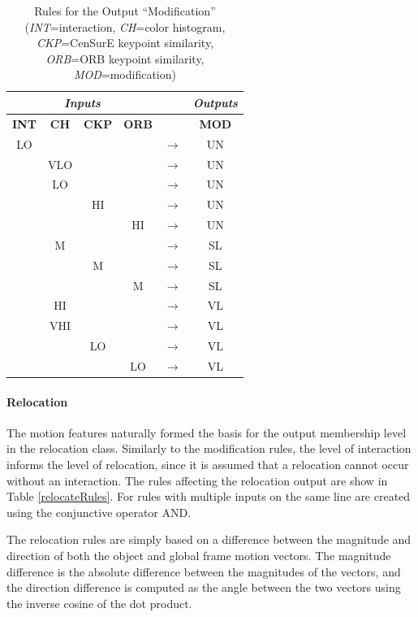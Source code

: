 \documentclass[12pt]{report}
\begin{document}
\begin{table}
\caption{Rules for the Output ``Modification'' (\textit{INT}=interaction, \textit{CH}=color histogram, \textit{CKP}=CenSurE keypoint similarity, \textit{ORB}=ORB keypoint similarity,  \textit{MOD}=modification)}
\begin{center}
\begin{tabular}{cccccc}
\hline
\multicolumn{4}{c}{\textbf{\textit{Inputs}}}& &\textbf{\textit{Outputs}} \\
\hline
\hline
\textbf{INT} & \textbf{CH} & \textbf{CKP} & \textbf{ORB} & & \textbf{MOD}\\
\hline
LO & & & & $\longrightarrow$ & UN \\
 & VLO & &  & $\longrightarrow$ & UN \\
 & LO & & & $\longrightarrow$ & UN \\
 & & HI & & $\longrightarrow$ & UN \\
 & & & HI & $\longrightarrow$ & UN \\
 & M & & & $\longrightarrow$ & SL \\
 & & M & & $\longrightarrow$ & SL \\
 & & & M & $\longrightarrow$ & SL \\
 & HI & & &  $\longrightarrow$ & VL \\
 & VHI & & & $\longrightarrow$ & VL \\
 & & LO & & $\longrightarrow$ & VL \\
 & & & LO & $\longrightarrow$ & VL \\
\hline
\end{tabular}
\label{modifyRules}
\end{center}
\end{table}

\paragraph{Relocation}
The motion features naturally formed the basis for the output membership level in the relocation class. Similarly to the modification rules, the level of interaction informs the level of relocation, since it is assumed that a relocation cannot occur without an interaction. The rules affecting the relocation output are show in Table \ref{relocateRules}. For rules with multiple inputs on the same line are created using the conjunctive operator AND.

The relocation rules are simply based on a difference between the magnitude and direction of both the object and global frame motion vectors. The magnitude difference is the absolute difference between the magnitudes of the vectors, and the direction difference is computed as the angle between the two vectors using the inverse cosine of the dot product.
\end{document}
